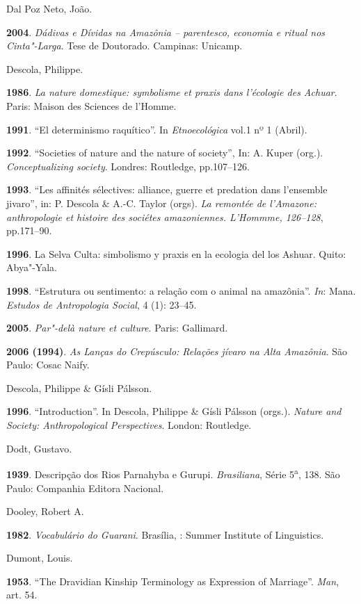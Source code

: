 \begin{Parskip}
Dal Poz Neto, João.

\textbf{2004}. \emph{Dádivas e Dívidas na Amazônia -- parentesco,
economia e ritual nos Cinta"-Larga}. Tese de Doutorado. Campinas:
Unicamp.

Descola, Philippe.

\textbf{1986}. \emph{La nature domestique: symbolisme et praxis dans
l'écologie des Achuar}. Paris: Maison des Sciences de l'Homme.

\textbf{1991}. ``El determinismo raquítico''. In \emph{Etnoecológica}
vol.1 nº 1 (Abril).

\textbf{1992}. ``Societies of nature and the nature of society'', In: A.
Kuper (org.). \emph{Conceptualizing society}. Londres: Routledge,
pp.107--126.

\textbf{1993}. ``Les affinités sélectives: alliance, guerre et predation
dans l'ensemble jivaro'', in: P. Descola \& A.-C. Taylor (orgs). \emph{La
remontée de l'Amazone: anthropologie et histoire des sociétes
amazoniennes. L'Hommme, 126--128}, pp.171--90.

\textbf{1996}. La Selva Culta: simbolismo y praxis en la ecologia del
los Ashuar. Quito: Abya"-Yala.

\textbf{1998}. ``Estrutura ou sentimento: a relação com o animal na
amazônia''. \emph{In}: Mana. \emph{Estudos de Antropologia Social}, 4 (1):
23--45.

\textbf{2005}. \emph{Par"-delà nature et culture}. Paris: Gallimard.

\textbf{2006 (1994)}. \emph{As Lanças do Crepúsculo: Relações jívaro na
Alta Amazônia}. São Paulo: Cosac Naify.

Descola, Philippe \& Gísli Pálsson.

\textbf{1996}. ``Introduction''. In Descola, Philippe \& Gísli Pálsson
(orgs.). \emph{Nature and Society: Anthropological Perspectives}.
London: Routledge.

Dodt, Gustavo.

\textbf{1939}. Descripção dos Rios Parnahyba e Gurupi.
\emph{Brasiliana}, Série 5\textsuperscript{{a}}, 138. São Paulo:
Companhia Editora Nacional.

Dooley, Robert A.

\textbf{1982}. \emph{Vocabulário do Guarani}. Brasília, : Summer
Institute of Linguistics.

Dumont, Louis.

\textbf{1953}. ``The Dravidian Kinship Terminology as Expression of
Marriage''. \emph{Man}, art. 54.


\end{Parskip}
